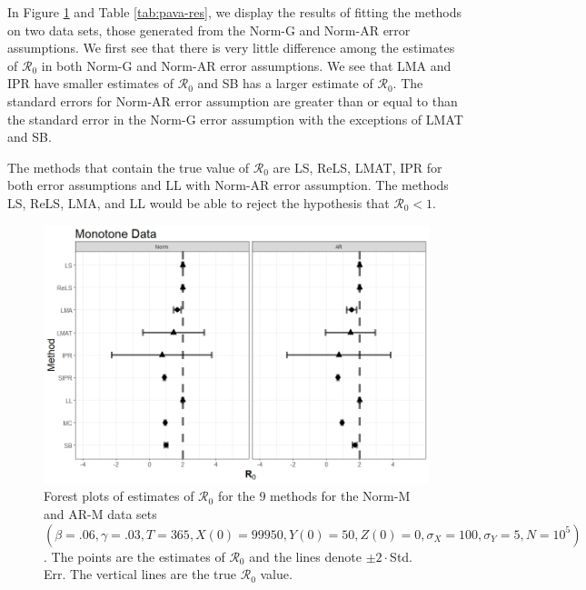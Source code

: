 \documentclass[12pt]{article}
\newcommand{\xxsir}{\ensuremath{9} } %
\newcommand{\rr}{\ensuremath{\mathcal{R}_0}}
\begin{document}
In Figure \ref{fig:pava-res} and Table \ref{tab:pava-res}, we display the results of fitting the methods on two data sets, those generated from the Norm-G and Norm-AR error assumptions.  We first see that there is very little difference among the estimates of $\rr$ in both Norm-G and Norm-AR error assumptions.  We see that LMA and IPR have smaller estimates of $\rr$ and SB has a larger estimate of $\rr$.  The standard errors for Norm-AR error assumption are greater than or equal to than the standard error in the Norm-G error assumption with the exceptions of LMAT and SB.

The methods that contain the true value of $\rr$ are LS, ReLS, LMAT, IPR for both error assumptions and LL with Norm-AR error assumption.  The methods LS, ReLS, LMA, and LL would be able to reject the hypothesis that $\rr < 1$.

\begin{figure}[H]
	\centering
	\includegraphics[scale=0.5]{images/mono.jpeg}
	\caption{Forest plots of estimates of $\rr$ for the \xxsir methods for the Norm-M and AR-M data sets $(\beta=.06, \gamma=.03, T=365, X(0)=99950, Y(0)=50, Z(0)=0, \sigma_X=100, \sigma_Y=5, N=10^5)$.  The points are the estimates of $\rr$ and the lines denote $\pm 2\cdot $Std. Err.  The vertical lines are the true $\rr$ value.}
	\label{fig:pava-res}
\end{figure}
\end{document}
